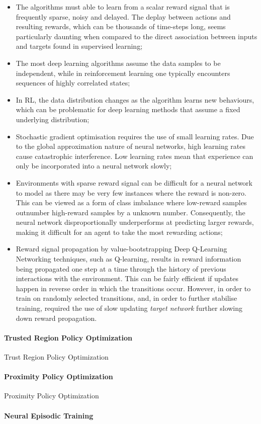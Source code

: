 \documentclass[12pt,a4paper]{article}
\begin{document}
\begin{itemize}
	\item The algorithms must able to learn from a scalar reward signal that is frequently sparse, noisy and delayed. The deplay between actions and resulting rewards, which can be thousands of time-steps long, seems particularly daunting when compared to the direct association between inputs and targets found in supervised learning;
	\item The most deep learning algorithms assume the data samples to be independent, while in reinforcement learning one typically encounters sequences of highly correlated states;
	\item In RL, the data distribution changes as the algorithm learns new behaviours, which can be problematic for deep learning methods that assume a fixed underlying distribution;
	\item Stochastic gradient optimisation requires the use of small learning rates. Due to the global approximation nature of neural networks, high learning rates cause catastrophic interference. Low learning rates mean that experience can only be incorporated into a neural network slowly;
	\item Environments with sparse reward signal can be difficult for a neural network to model as there may be very few instances where the reward is non-zero. This can be viewed as a form of class imbalance where low-reward samples outnumber high-reward samples by a unknown number. Consequently, the neural network disproportionally underperforms at predicting larger rewards, making it difficult for an agent to take the most rewarding actions;
	\item Reward signal propagation by value-bootstrapping Deep Q-Learning Networking techniques, such as Q-learning, results in reward information being propagated one step at a time through the history of previous interactions with the environment. This can be fairly efficient if updates happen in reverse order in which the transitions occur. However, in order to train on randomly selected transitions, and, in order to further stabilise training, required the use of slow updating \textit{target network} further slowing down reward propagation.
\end{itemize} 





\paragraph{Trusted Region Policy Optimization} Trust Region Policy Optimization
\paragraph{Proximity Policy Optimization} Proximity Policy Optimization
\paragraph{Neural Episodic Training} \cite{Pritzel2017Neural}

\ifx\allfiles\undefined
%


\end{document}
